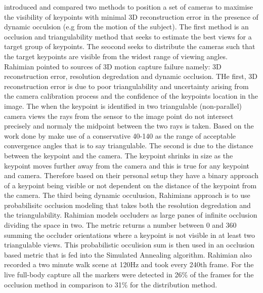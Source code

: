 \citet{rahimian2016optimal} introduced and compared two methods to position a set of cameras to maximise the visibility of keypoints with minimal 3D reconstruction error in the presence of dynamic occulsion (e.g from the motion of the subject). The first method is an occlusion and triangulability method that seeks to estimate the best views for a target group of keypoints. The seocond seeks to distribute the cameras such that the target keypoints are visible  from the widest range of viewing angles.
Rahimian pointed to sources of 3D motion capture failure namely: 3D reconstruction error, resolution degredation and dynamic occlusion. 
THe first, 3D reconstruction error is due to poor triangulability and uncertainty arising from the camera calibration process and the confidence of the keypoints location in the image. The when the keypoint is identified in two triangulable (non-parallel) camera views the rays from the sensor to the image point do not intersect precisely and normaly the midpoint between the two rays is taken. Based on the work done by \citet{olague2002optimal} \citet{rahimian2016optimal} make use of a conservative 40-140 as the range of acceptable convergence angles that is to say triangulable.
The second is due to the distance between the keypoint and the camera. The keypoint shrinks in size as the keypoint moves further away from the camera and this is true for any keypoint and camera. Therefore based on their personal setup they have a binary approach of a keypoint being visible or not dependent on the distance of the keypoint from the camera. 
The third being dynamic occulusion, Rahimians approach is to use probabilisitc occlusion modeling that takes both the resolution degredation and the triangulability. Rahimian models occluders as large panes of infinite occlusion dividing the space in two. The metric returns a number between 0 and 360 summing the occluder orientations where a keypoint is not visible in at least two triangulable views. This probabilistic occulision sum is then used in an occlusion based metric that is fed into the Simulated Annealing algorithm.
Rahimian also recorded a two minute walk scene at 120Hz and took every 240th frame. For the live full-body capture all the markers were detected in 26\% of the frames for the occlusion method in comparison to 31\% for the distribution method. 
